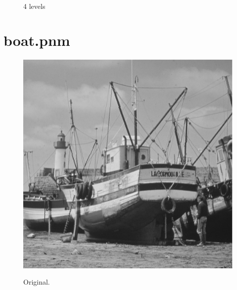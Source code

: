 \documentclass[english]{article}
\begin{document}
\begin{figure}[!htb]
  \caption{4 levels}\label{fig:awesome_image3}
\endminipage
\end{figure}



\newpage
\section{boat.pnm}
\begin{figure}[H]
	\centering
  \includegraphics[width=.5\linewidth]{../images/boat.png}
  \label{fig:fig1}
  \caption{Original.}
\end{figure}
\end{document}

